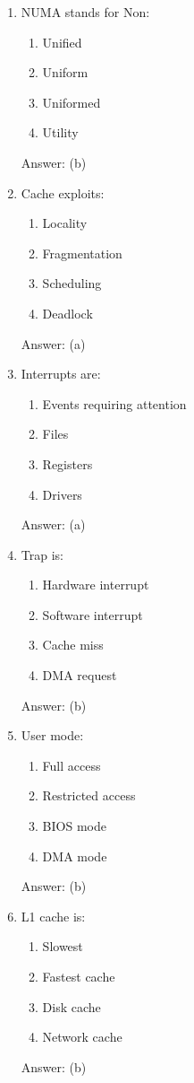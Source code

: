 \begin{enumerate}
\item NUMA stands for Non:
\begin{enumerate}[label=(\alph*)]
\item Unified
\item Uniform
\item Uniformed
\item Utility
\end{enumerate}
Answer: (b)

\item Cache exploits:
\begin{enumerate}[label=(\alph*)]
\item Locality
\item Fragmentation
\item Scheduling
\item Deadlock
\end{enumerate}
Answer: (a)

\item Interrupts are:
\begin{enumerate}[label=(\alph*)]
\item Events requiring attention
\item Files
\item Registers
\item Drivers
\end{enumerate}
Answer: (a)

\item Trap is:
\begin{enumerate}[label=(\alph*)]
\item Hardware interrupt
\item Software interrupt
\item Cache miss
\item DMA request
\end{enumerate}
Answer: (b)

\item User mode:
\begin{enumerate}[label=(\alph*)]
\item Full access
\item Restricted access
\item BIOS mode
\item DMA mode
\end{enumerate}
Answer: (b)

\item L1 cache is:
\begin{enumerate}[label=(\alph*)]
\item Slowest
\item Fastest cache
\item Disk cache
\item Network cache
\end{enumerate}
Answer: (b)


\end{enumerate}
